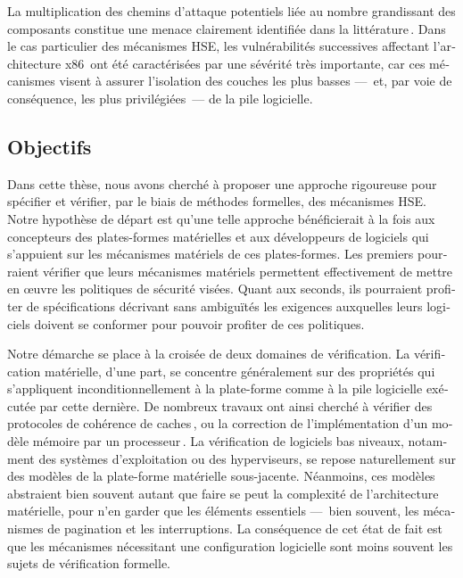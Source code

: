 \begin{otherlanguage}{french}
  La multiplication des chemins d’attaque potentiels liée au nombre grandissant
  des composants constitue une menace clairement identifiée dans la
  littérature\,\cite{wing2003compositionalattack}.
  Dans le cas particulier des mécanismes HSE, les vulnérabilités successives
  affectant l’architecture
  x86\,\cite{duflot2009smram,wojtczuk2009smram,domas2015sinkhole,kallenberg2015racecondition,kovah2015senter}
  ont été caractérisées par une sévérité très importante, car ces mécanismes
  visent à assurer l’isolation des couches les plus basses ---~et, par voie de
  conséquence, les plus privilégiées~--- de la pile logicielle.

  \subsection*{Objectifs}

  Dans cette thèse, nous avons cherché à proposer une approche rigoureuse pour
  spécifier et vérifier, par le biais de méthodes formelles, des mécanismes HSE.
  Notre hypothèse de départ est qu’une telle approche bénéficierait à la fois
  aux concepteurs des plates-formes matérielles et aux développeurs de logiciels
  qui s'appuient sur les mécanismes matériels de ces plates-formes.
  Les premiers pourraient vérifier que leurs mécanismes matériels permettent
  effectivement de mettre en œuvre les politiques de sécurité visées.
  Quant aux seconds, ils pourraient profiter de spécifications décrivant sans
  ambiguïtés les exigences auxquelles leurs logiciels doivent se conformer pour
  pouvoir profiter de ces politiques.

  Notre démarche se place à la croisée de deux domaines de vérification.
  La vérification matérielle, d’une part, se concentre généralement sur des
  propriétés qui s’appliquent inconditionnellement à la plate-forme comme à la
  pile logicielle exécutée par cette dernière.
  De nombreux travaux ont ainsi cherché à vérifier des protocoles de cohérence
  de caches\,\cite{stern1995cachecoherence,vijayaraghavan2015modular}, ou la
  correction de l’implémentation d’un modèle mémoire par un
  processeur\,\cite{choi2017kami}.
  La vérification de logiciels bas niveaux, notamment des systèmes
  d’exploitation ou des hyperviseurs, se repose naturellement sur des modèles de
  la plate-forme matérielle sous-jacente.
  Néanmoins, ces modèles abstraient bien souvent autant que faire se peut la
  complexité de l’architecture matérielle, pour n’en garder que les éléments
  essentiels ---~bien souvent, les mécanismes de pagination et les
  interruptions.
  La conséquence de cet état de fait est que les mécanismes nécessitant une
  configuration logicielle sont moins souvent les sujets de vérification
  formelle.


\end{otherlanguage}
